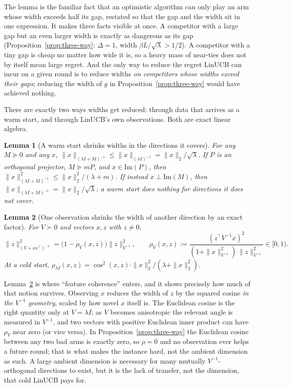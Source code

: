 \documentclass{article}
\newtheorem{lemma}{Lemma}
\theoremstyle{definition}
\theoremstyle{remark}
\theoremstyle{remark}
\begin{document}
The lemma is the familiar fact that an optimistic algorithm can only play an
arm whose width exceeds half its gap, restated so that the gap and the width
sit in one expression. It makes three facts visible at once. A competitor with
a large gap but an even larger width is exactly as dangerous as its gap
(Proposition~\ref{prop:three-way}: $\Delta=1$, width $\beta L/\sqrt\lambda>1/2$).
A competitor with a tiny gap is cheap no matter how wide it is, so a heavy
mass of near-ties does not by itself mean large regret. And the only way to
reduce the regret LinUCB can incur on a given round is to reduce widths
\emph{on competitors whose widths exceed their gaps}; reducing the width of
$g$ in Proposition~\ref{prop:three-way} would have achieved nothing.

There are exactly two ways widths get reduced: through data that arrives as a
warm start, and through LinUCB's own observations. Both are exact linear
algebra.

\begin{lemma}[A warm start shrinks widths in the directions it covers]
\label{lem:loewner}
For any $M\succeq0$ and any $x$, $\|x\|_{(\lambda I+M)^{-1}}\le\|x\|_{(\lambda I)^{-1}}=\|x\|_2/\sqrt\lambda$.
If $P$ is an orthogonal projector, $M\succeq mP$, and $x\in\mathrm{Im}(P)$, then
$\|x\|^2_{(\lambda I+M)^{-1}}\le\|x\|_2^2/(\lambda+m)$. If instead $x\perp\mathrm{Im}(M)$,
then $\|x\|_{(\lambda I+M)^{-1}}=\|x\|_2/\sqrt\lambda$: a warm start does nothing
for directions it does not cover.
\end{lemma}

\begin{lemma}[One observation shrinks the width of another direction by an
exact factor]
\label{lem:transfer}
For $V\succ0$ and vectors $x,z$ with $z\ne0$,
\[
\|z\|^2_{(V+xx^\top)^{-1}}=\bigl(1-\rho_V(x,z)\bigr)\|z\|^2_{V^{-1}},
\qquad
\rho_V(x,z):=\frac{(z^\top V^{-1}x)^2}{(1+\|x\|^2_{V^{-1}})\,\|z\|^2_{V^{-1}}}\in[0,1).
\]
At a cold start, $\rho_{\lambda I}(x,z)=\cos^2(x,z)\cdot\|x\|_2^2/(\lambda+\|x\|_2^2)$.
\end{lemma}

Lemma~\ref{lem:transfer} is where ``feature coherence'' enters, and it shows
precisely how much of that notion survives. Observing $x$ reduces the width of
$z$ by the squared cosine \emph{in the $V^{-1}$ geometry}, scaled by how novel
$x$ itself is. The Euclidean cosine is the right quantity only at $V=\lambda I$;
as $V$ becomes anisotropic the relevant angle is measured in $V^{-1}$, and two
vectors with positive Euclidean inner product can have $\rho_V$ near zero (or
vice versa). In Proposition~\ref{prop:three-way} the Euclidean cosine between
any two bad arms is exactly zero, so $\rho=0$ and no observation ever helps a
future round; that is what makes the instance hard, not the ambient dimension
as such. A large ambient dimension is necessary for many mutually
$V^{-1}$-orthogonal directions to exist, but it is the lack of transfer, not
the dimension, that cold LinUCB pays for.
\end{document}
